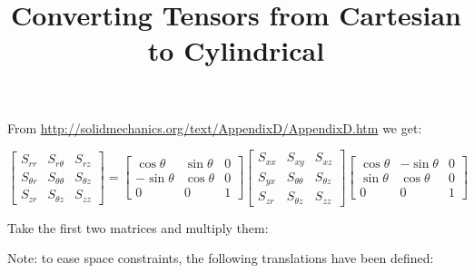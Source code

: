 \documentclass{article}
\begin{document}
\title{Converting Tensors from Cartesian to Cylindrical}
\maketitle
\doclicenseThis{}

From \url{http://solidmechanics.org/text/AppendixD/AppendixD.htm} we get:

\begin{equation}
    \begin{bmatrix}
    S_{rr} & S_{r\theta} & S_{rz} \\
    S_{\theta r} & S_{\theta\theta} & S_{\theta z} \\
    S_{zr} & S_{\theta z} & S_{zz}
    \end{bmatrix}
    =
    \begin{bmatrix}
        \cos \theta & \sin \theta & 0\\
        -\sin \theta & \cos \theta & 0 \\
        0 & 0 & 1
    \end{bmatrix}
    \begin{bmatrix}
    S_{xx} & S_{xy} & S_{xz} \\
    S_{yx} & S_{\theta\theta} & S_{\theta z} \\
    S_{zr} & S_{\theta z} & S_{zz}
    \end{bmatrix}
    \begin{bmatrix}
        \cos \theta & -\sin \theta & 0\\
        \sin \theta & \cos \theta & 0 \\
        0 & 0 & 1
    \end{bmatrix}
\end{equation}

Take the first two matrices and multiply them:

Note: to ease space constraints, the following translations have been defined:
\end{document}
